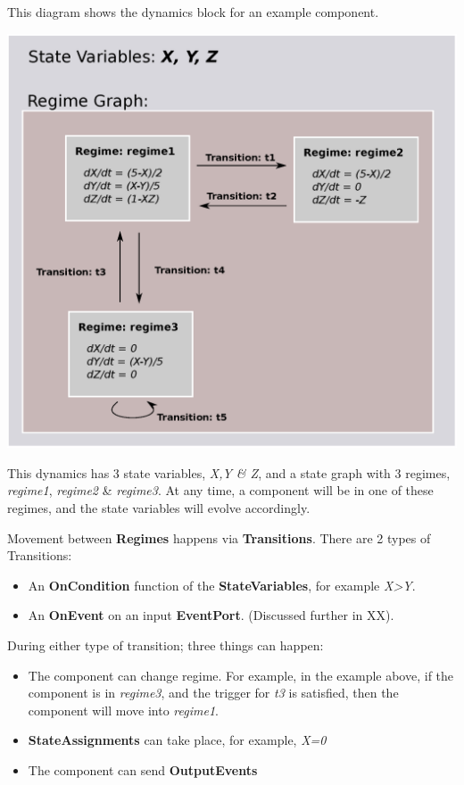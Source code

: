 \documentclass[a4paper,english]{article}
\providecommand*{\DUroletitlereference}[1]{\textsl{#1}}
\begin{document}
This diagram shows the dynamics block for an example component.

\includegraphics{al_figs/SimpleRegimeGraph.eps}

This dynamics has 3 state variables, \emph{X,Y \& Z}, and a state graph with 3
regimes, \emph{regime1}, \emph{regime2} \& \emph{regime3}. At any time, a component will be in one of these regimes, and the state variables will evolve accordingly.

Movement between \textbf{Regimes} happens via \textbf{Transitions}. There are 2 types of
Transitions:
%
\begin{itemize}

\item An \textbf{OnCondition} function of the \textbf{StateVariables}, for example \DUroletitlereference{X>Y}.

\item An \textbf{OnEvent} on an input \textbf{EventPort}. (Discussed further in XX).

\end{itemize}

During either type of transition; three things can happen:
%
\begin{itemize}

\item The component can change regime. For example, in the example above, if the
component is in \emph{regime3}, and the trigger for \emph{t3} is satisfied, then the
component will move into \emph{regime1}.

\item \textbf{StateAssignments} can take place, for example, \DUroletitlereference{X=0}

\item The component can send \textbf{OutputEvents}

\end{itemize}
\end{document}
